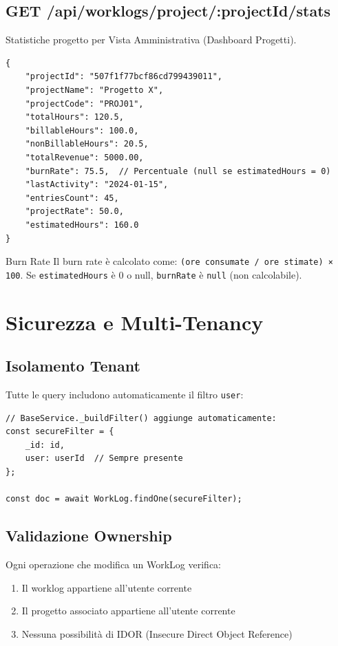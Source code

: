 \documentclass[11pt,a4paper]{article}
\begin{document}
\subsection{GET /api/worklogs/project/:projectId/stats}

Statistiche progetto per Vista Amministrativa (Dashboard Progetti).

\begin{lstlisting}[caption=Response]
{
    "projectId": "507f1f77bcf86cd799439011",
    "projectName": "Progetto X",
    "projectCode": "PROJ01",
    "totalHours": 120.5,
    "billableHours": 100.0,
    "nonBillableHours": 20.5,
    "totalRevenue": 5000.00,
    "burnRate": 75.5,  // Percentuale (null se estimatedHours = 0)
    "lastActivity": "2024-01-15",
    "entriesCount": 45,
    "projectRate": 50.0,
    "estimatedHours": 160.0
}
\end{lstlisting}

\begin{tipbox}{Burn Rate}
Il burn rate è calcolato come: \texttt{(ore consumate / ore stimate) × 100}.
Se \texttt{estimatedHours} è 0 o null, \texttt{burnRate} è \texttt{null} (non calcolabile).
\end{tipbox}

\section{Sicurezza e Multi-Tenancy}

\subsection{Isolamento Tenant}

Tutte le query includono automaticamente il filtro \texttt{user}:

\begin{lstlisting}[caption=Query Multi-Tenant]
// BaseService._buildFilter() aggiunge automaticamente:
const secureFilter = {
    _id: id,
    user: userId  // Sempre presente
};

const doc = await WorkLog.findOne(secureFilter);
\end{lstlisting}

\subsection{Validazione Ownership}

Ogni operazione che modifica un WorkLog verifica:
\begin{enumerate}
    \item Il worklog appartiene all'utente corrente
    \item Il progetto associato appartiene all'utente corrente
    \item Nessuna possibilità di IDOR (Insecure Direct Object Reference)
\end{enumerate}
\end{document}
